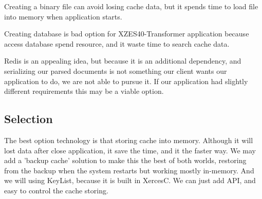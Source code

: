 Creating a binary file can avoid losing cache data, but it spends time to load file into memory when application starts.

Creating database is bad option for XZES40-Transformer application because access database spend resource, and it waste time to search cache data.

Redis is an appealing idea, but because it is an additional dependency, and serializing our parsed documents is not something our client wants our application to do, we are not able to pursue it.
If our application had slightly different requirements this may be a viable option.

\subsection{Selection}

The best option technology is that storing cache into memory.
Although it will lost data after close application, it save the time, and it the faster way.
We may add a 'backup cache' solution to make this the best of both worlds, restoring from the backup when the system restarts but working mostly in-memory.
And we will using KeyList, because it is built in XercesC.
We can just add API, and easy to control the cache storing.
